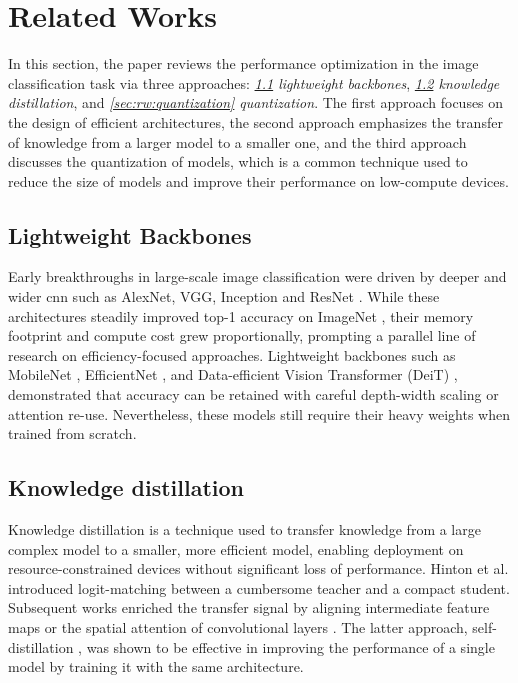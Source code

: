 \section{Related Works}

In this section, the paper reviews the performance optimization
in the image classification task via three approaches:
\textit{\ref{sec:rw:lightweight_backbones} lightweight backbones},
\textit{\ref{sec:rw:knowledge_distillation} knowledge distillation},
and \textit{\ref{sec:rw:quantization} quantization}.
The first approach focuses on the design of efficient architectures,
the second approach emphasizes the transfer of knowledge from a larger model to a smaller one,
and the third approach discusses the quantization of models,
which is a common technique used to reduce the size of models
and improve their performance on low-compute devices.

\subsection{Lightweight Backbones}
\label{sec:rw:lightweight_backbones}

Early breakthroughs in large-scale image classification were driven by deeper and wider \gls*{cnn}
such as AlexNet, VGG, Inception and ResNet \cite{krizhevsky2012imagenet, simonyan2014very, szegedy2015going, he2016deep}.
While these architectures steadily improved top-1 accuracy on ImageNet \cite{deng2009imagenet},
their memory footprint and compute cost grew proportionally,
prompting a parallel line of research on efficiency-focused approaches.
Lightweight backbones such as MobileNet \cite{howard2017mobilenets,sandler2018mobilenetv2},
EfficientNet \cite{tan2019efficientnet}, and Data-efficient Vision Transformer (DeiT) \cite{touvron2021training},
demonstrated that accuracy can be retained with careful depth-width scaling or attention re-use.
Nevertheless, these models still require their heavy weights when trained from scratch.

\subsection{Knowledge distillation}
\label{sec:rw:knowledge_distillation}

Knowledge distillation is a technique used to transfer knowledge
from a large complex model to a smaller, more efficient model,
enabling deployment on resource-constrained devices without significant loss of performance.
Hinton et al. \cite{hinton2015distilling} introduced logit-matching between a cumbersome teacher and a compact student.
Subsequent works enriched the transfer signal by aligning intermediate feature maps \cite{romero2014fitnets}
or the spatial attention of convolutional layers \cite{zagoruyko2016paying}.
The latter approach, self-distillation \cite{zhang2019your},
was shown to be effective in improving the performance of a single model
by training it with the same architecture.

